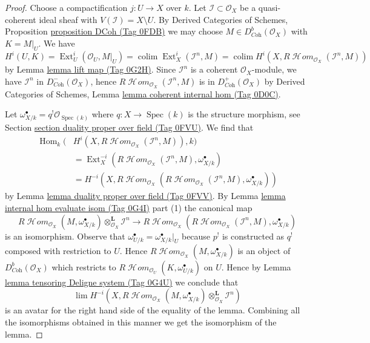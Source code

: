 \documentclass{amsart}
\theoremstyle{plain}
\theoremstyle{definition}
\theoremstyle{remark}
\numberwithin{equation}{subsection}
\def\lim{\mathop{\mathrm{lim}}\nolimits}
\def\colim{\mathop{\mathrm{colim}}\nolimits}
\def\Spec{\mathop{\mathrm{Spec}}}
\def\Hom{\mathop{\mathrm{Hom}}\nolimits}
\def\Ext{\mathop{\mathrm{Ext}}\nolimits}
\def\SheafHom{\mathop{\mathcal{H}\!\mathit{om}}\nolimits}
\begin{document}
\begin{proof}
Choose a compactification $j : U \to X$ over $k$. Let
$\mathcal{I} \subset \mathcal{O}_X$ be a quasi-coherent ideal
sheaf with $V(\mathcal{I}) = X \setminus U$.
By Derived Categories of Schemes, Proposition \href{https://stacks.math.columbia.edu/tag/0FDB}{proposition DCoh (Tag 0FDB)}
we may choose $M \in D^b_{\textit{Coh}}(\mathcal{O}_X)$
with $K = M|_U$. We have
$$
H^i(U, K) =
\Ext^i_U(\mathcal{O}_U, M|_U) =
\colim \Ext^i_X(\mathcal{I}^n, M) =
\colim H^i(X, R\SheafHom_{\mathcal{O}_X}(\mathcal{I}^n, M))
$$
by Lemma \href{https://stacks.math.columbia.edu/tag/0G2H}{lemma lift map (Tag 0G2H)}.
Since $\mathcal{I}^n$ is a coherent $\mathcal{O}_X$-module,
we have $\mathcal{I}^n$ in $D^-_{\textit{Coh}}(\mathcal{O}_X)$,
hence $R\SheafHom_{\mathcal{O}_X}(\mathcal{I}^n, M)$ is in
$D^+_{\textit{Coh}}(\mathcal{O}_X)$ by
Derived Categories of Schemes, Lemma
\href{https://stacks.math.columbia.edu/tag/0D0C}{lemma coherent internal hom (Tag 0D0C)}.

\medskip\noindent
Let $\omega_{X/k}^\bullet = q^!\mathcal{O}_{\Spec(k)}$ where
$q : X \to \Spec(k)$ is the structure morphism, see
Section \href{https://stacks.math.columbia.edu/tag/0FVU}{section duality proper over field (Tag 0FVU)}. We find that
\begin{align*}
\Hom_k(
&
H^i(X, R\SheafHom_{\mathcal{O}_X}(\mathcal{I}^n, M)), k) \\
& =
\Ext^{-i}_X(R\SheafHom_{\mathcal{O}_X}(\mathcal{I}^n, M),
\omega_{X/k}^\bullet) \\
& =
H^{-i}(X, R\SheafHom_{\mathcal{O}_X}(R\SheafHom_{\mathcal{O}_X}(
\mathcal{I}^n, M), \omega_{X/k}^\bullet))
\end{align*}
by Lemma \href{https://stacks.math.columbia.edu/tag/0FVV}{lemma duality proper over field (Tag 0FVV)}. By
Lemma \href{https://stacks.math.columbia.edu/tag/0G4I}{lemma internal hom evaluate isom (Tag 0G4I)} part (1) the canonical map
$$
R\SheafHom_{\mathcal{O}_X}(M, \omega_{X/k}^\bullet)
\otimes_{\mathcal{O}_X}^\mathbf{L} \mathcal{I}^n
\longrightarrow
R\SheafHom_{\mathcal{O}_X}(R\SheafHom_{\mathcal{O}_X}(
\mathcal{I}^n, M), \omega_{X/k}^\bullet)
$$
is an isomorphism. Observe that
$\omega^\bullet_{U/k} = \omega^\bullet_{X/k}|_U$
because $p^!$ is constructed as $q^!$ composed with restriction to $U$.
Hence $R\SheafHom_{\mathcal{O}_X}(M, \omega_{X/k}^\bullet)$ is
an object of $D^b_{\textit{Coh}}(\mathcal{O}_X)$ which restricts
to $R\SheafHom_{\mathcal{O}_U}(K, \omega_{U/k}^\bullet)$ on $U$.
Hence by Lemma \href{https://stacks.math.columbia.edu/tag/0G4U}{lemma tensoring Deligne system (Tag 0G4U)} we conclude that
$$
\lim H^{-i}(X, R\SheafHom_{\mathcal{O}_X}(M, \omega_{X/k}^\bullet)
\otimes_{\mathcal{O}_X}^\mathbf{L} \mathcal{I}^n)
$$
is an avatar for the right hand side of the equality of the lemma.
Combining all the isomorphisms obtained in this manner we get
the isomorphism of the lemma.
\end{proof}
\end{document}
